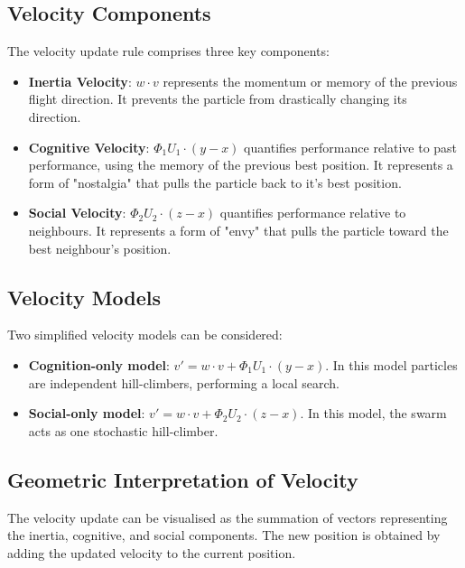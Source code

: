 \subsection*{Velocity Components}
The velocity update rule comprises three key components:

\begin{itemize}
    \item \textbf{Inertia Velocity}: $w \cdot v$ represents the momentum or memory of the previous flight direction. It prevents the particle from drastically changing its direction.
    \item \textbf{Cognitive Velocity}: $\Phi_1 U_1 \cdot (y - x)$ quantifies performance relative to past performance, using the memory of the previous best position. It represents a form of "nostalgia" that pulls the particle back to it's best position.
    \item \textbf{Social Velocity}: $\Phi_2 U_2 \cdot (z - x)$ quantifies performance relative to neighbours. It represents a form of "envy" that pulls the particle toward the best neighbour's position.
\end{itemize}

\subsection*{Velocity Models}
Two simplified velocity models can be considered:

\begin{itemize}
    \item \textbf{Cognition-only model}: $v' = w \cdot v + \Phi_1 U_1 \cdot (y - x)$. In this model particles are independent hill-climbers, performing a local search.
    \item \textbf{Social-only model}: $v' = w \cdot v + \Phi_2 U_2 \cdot (z - x)$. In this model, the swarm acts as one stochastic hill-climber.
\end{itemize}

\subsection*{Geometric Interpretation of Velocity}
The velocity update can be visualised as the summation of vectors representing the inertia, cognitive, and social components. The new position is obtained by adding the updated velocity to the current position.


